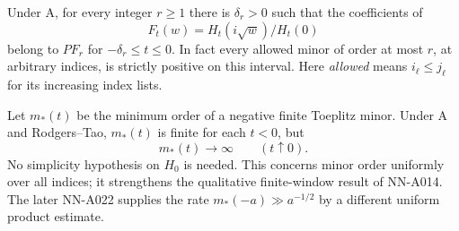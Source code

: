 \begin{theorem}
Under A, for every integer $r\ge1$ there is $\delta_r>0$ such that
the coefficients of
\[
 F_t(w)=H_t(i\sqrt w)/H_t(0)
\]
belong to $PF_r$ for $-\delta_r\le t\le0$. In fact every allowed
minor of order at most $r$, at arbitrary indices, is strictly
positive on this interval. Here \emph{allowed} means
$i_\ell\le j_\ell$ for its increasing index lists.

Let $m_*(t)$ be the minimum order of a negative finite Toeplitz
minor. Under A and Rodgers--Tao, $m_*(t)$ is finite for each $t<0$,
but
\[
                    m_*(t)\longrightarrow\infty
                         \qquad(t\uparrow0).
\]
No simplicity hypothesis on $H_0$ is needed. This concerns minor
order uniformly over all indices; it strengthens the qualitative
finite-window result of NN-A014. The later NN-A022 supplies the
rate $m_*(-a)\gg a^{-1/2}$ by a different uniform product estimate.
\end{theorem}

